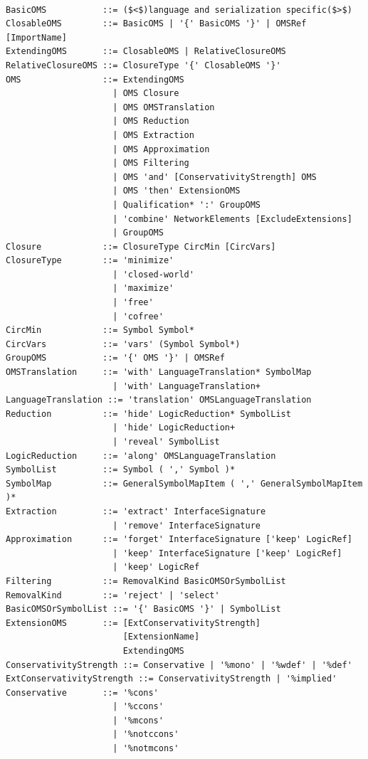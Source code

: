 \documentclass[10pt, a4paper]{isov2}
\begin{document}
\begin{lstlisting}[language=ebnf,escapeinside={()},mathescape]

BasicOMS           ::= ($<$)language and serialization specific($>$) 
ClosableOMS        ::= BasicOMS | '{' BasicOMS '}' | OMSRef [ImportName]
ExtendingOMS       ::= ClosableOMS | RelativeClosureOMS
RelativeClosureOMS ::= ClosureType '{' ClosableOMS '}'
OMS                ::= ExtendingOMS
                     | OMS Closure
                     | OMS OMSTranslation
                     | OMS Reduction
                     | OMS Extraction
                     | OMS Approximation
                     | OMS Filtering
                     | OMS 'and' [ConservativityStrength] OMS
                     | OMS 'then' ExtensionOMS
                     | Qualification* ':' GroupOMS
                     | 'combine' NetworkElements [ExcludeExtensions]
                     | GroupOMS
Closure            ::= ClosureType CircMin [CircVars]
ClosureType        ::= 'minimize'
                     | 'closed-world'
                     | 'maximize'
                     | 'free'
                     | 'cofree'
CircMin            ::= Symbol Symbol*
CircVars           ::= 'vars' (Symbol Symbol*)
GroupOMS           ::= '{' OMS '}' | OMSRef
OMSTranslation     ::= 'with' LanguageTranslation* SymbolMap
                     | 'with' LanguageTranslation+
LanguageTranslation ::= 'translation' OMSLanguageTranslation
Reduction          ::= 'hide' LogicReduction* SymbolList
                     | 'hide' LogicReduction+
                     | 'reveal' SymbolList
LogicReduction     ::= 'along' OMSLanguageTranslation
SymbolList         ::= Symbol ( ',' Symbol )*
SymbolMap          ::= GeneralSymbolMapItem ( ',' GeneralSymbolMapItem )*
Extraction         ::= 'extract' InterfaceSignature
                     | 'remove' InterfaceSignature
Approximation      ::= 'forget' InterfaceSignature ['keep' LogicRef]
                     | 'keep' InterfaceSignature ['keep' LogicRef]
                     | 'keep' LogicRef
Filtering          ::= RemovalKind BasicOMSOrSymbolList
RemovalKind        ::= 'reject' | 'select'
BasicOMSOrSymbolList ::= '{' BasicOMS '}' | SymbolList
ExtensionOMS       ::= [ExtConservativityStrength]
                       [ExtensionName]
                       ExtendingOMS
ConservativityStrength ::= Conservative | '%mono' | '%wdef' | '%def'
ExtConservativityStrength ::= ConservativityStrength | '%implied'
Conservative       ::= '%cons'
                     | '%ccons'
                     | '%mcons'
                     | '%notccons'
                     | '%notmcons'

\end{lstlisting}
\end{document}
